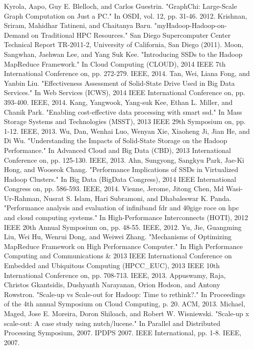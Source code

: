 \documentclass[conference]{IEEEtran}
\begin{document}
\begin{thebibliography}{1}
Kyrola, Aapo, Guy E. Blelloch, and Carlos Guestrin. "GraphChi: Large-Scale Graph Computation on Just a PC." In OSDI, vol. 12, pp. 31-46. 2012.
Krishnan, Sriram, Mahidhar Tatineni, and Chaitanya Baru. "myHadoop-Hadoop-on-Demand on Traditional HPC Resources." San Diego Supercomputer Center Technical Report TR-2011-2, University of California, San Diego (2011).
Moon, Sangwhan, Jaehwan Lee, and Yang Suk Kee. "Introducing SSDs to the Hadoop MapReduce Framework." In Cloud Computing (CLOUD), 2014 IEEE 7th International Conference on, pp. 272-279. IEEE, 2014.
Tan, Wei, Liana Fong, and Yanbin Liu. "Effectiveness Assessment of Solid-State Drive Used in Big Data Services." In Web Services (ICWS), 2014 IEEE International Conference on, pp. 393-400. IEEE, 2014.
Kang, Yangwook, Yang-suk Kee, Ethan L. Miller, and Chanik Park. "Enabling cost-effective data processing with smart ssd." In Mass Storage Systems and Technologies (MSST), 2013 IEEE 29th Symposium on, pp. 1-12. IEEE, 2013.
Wu, Dan, Wenhai Luo, Wenyan Xie, Xiaoheng Ji, Jian He, and Di Wu. "Understanding the Impacts of Solid-State Storage on the Hadoop Performance." In Advanced Cloud and Big Data (CBD), 2013 International Conference on, pp. 125-130. IEEE, 2013.
Ahn, Sungyong, Sangkyu Park, Jae-Ki Hong, and Wooseok Chang. "Performance Implications of SSDs in Virtualized Hadoop Clusters." In Big Data (BigData Congress), 2014 IEEE International Congress on, pp. 586-593. IEEE, 2014.
Vienne, Jerome, Jitong Chen, Md Wasi-Ur-Rahman, Nusrat S. Islam, Hari Subramoni, and Dhabaleswar K. Panda. "Performance analysis and evaluation of infiniband fdr and 40gige roce on hpc and cloud computing systems." In High-Performance Interconnects (HOTI), 2012 IEEE 20th Annual Symposium on, pp. 48-55. IEEE, 2012.
Yu, Jie, Guangming Liu, Wei Hu, Wenrui Dong, and Weiwei Zhang. "Mechanisms of Optimizing MapReduce Framework on High Performance Computer." In High Performance Computing and Communications \& 2013 IEEE International Conference on Embedded and Ubiquitous Computing (HPCC\_EUC), 2013 IEEE 10th International Conference on, pp. 708-713. IEEE, 2013.
Appuswamy, Raja, Christos Gkantsidis, Dushyanth Narayanan, Orion Hodson, and Antony Rowstron. "Scale-up vs Scale-out for Hadoop: Time to rethink?." In Proceedings of the 4th annual Symposium on Cloud Computing, p. 20. ACM, 2013.
Michael, Maged, Jose E. Moreira, Doron Shiloach, and Robert W. Wisniewski. "Scale-up x scale-out: A case study using nutch/lucene." In Parallel and Distributed Processing Symposium, 2007. IPDPS 2007. IEEE International, pp. 1-8. IEEE, 2007.

\end{thebibliography}
\end{document}
